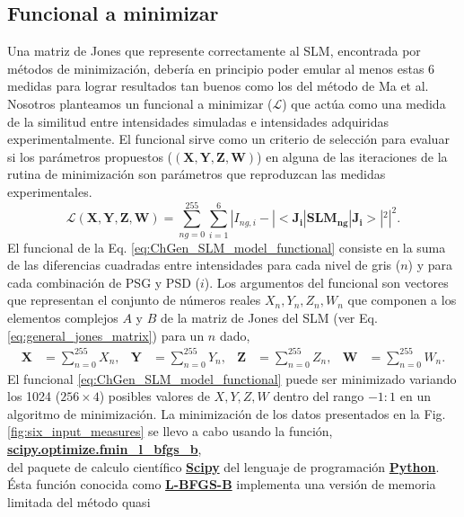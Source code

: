 \subsection{Funcional a minimizar}
Una matriz de Jones que represente correctamente al SLM, encontrada por
métodos de minimización, debería en principio poder
emular al menos estas 6 medidas para lograr resultados tan buenos como
los del método de Ma et al. Nosotros planteamos un funcional a
minimizar ($\mathcal{L}$) que actúa como una medida de la similitud entre 
intensidades simuladas e intensidades adquiridas experimentalmente. El
funcional sirve como un criterio de selección para evaluar si los
parámetros propuestos ($(\mathbf{X,Y,Z,W})$) en alguna de las iteraciones de la rutina de
minimización son parámetros que reproduzcan las medidas
experimentales.  
\begin{equation}
\mathcal{L}(\mathbf{X,Y,Z,W}) = \sum_{ng=0}^{255}\sum_{i=1}^6 | I_{ng,i} -
|<\mathbf{J_{i}}|\mathbf{SLM_{ng}}|\mathbf{J_{i}}>|^2|^2.
\label{eq:ChGen_SLM_model_functional}  
\end{equation}
El funcional de la Eq. \ref{eq:ChGen_SLM_model_functional}  consiste en
la suma de las diferencias cuadradas entre intensidades para cada
nivel de gris ($n$) y para cada combinación de PSG y PSD ($i$). Los
argumentos del funcional son vectores que representan el conjunto de números
reales $X_n, Y_n, Z_n, W_n$ que componen a los elementos complejos $A$ y $B$
de la matriz de Jones del SLM (ver 
Eq. \ref{eq:general_jones_matrix}) para un $n$ dado,
\begin{align*}
\mathbf{X} &= \sum_{n=0}^{255}X_n,&\mathbf{Y} &= \sum_{n=0}^{255}Y_n,&\mathbf{Z} &= \sum_{n=0}^{255}Z_n,&\mathbf{W} &= \sum_{n=0}^{255}W_n.
\end{align*} 
El funcional \ref{eq:ChGen_SLM_model_functional}  puede ser minimizado
variando los 1024 ($256\times 4$) posibles valores 
de $X,Y,Z,W$ dentro del rango $-1:1$ en un algoritmo de
minimización. La minimización de los datos presentados en la
Fig. \ref{fig:six_input_measures} se llevo a cabo usando la función,\\
\hspace*{\fill}
\href{http://goo.gl/tv5Iyz}{\bf{scipy.optimize.fmin\_l\_bfgs\_b}}, \hspace*{\fill}\\ del
 paquete de calculo científico \href{http://goo.gl/fRhz8s}{\textbf{Scipy}} del
 lenguaje de programación \href{https://www.python.org}{\textbf{Python}}. Ésta
 función conocida como \href{http://en.wikipedia.org/wiki/Limited-memory\_BFGS}{\textbf{L-BFGS-B}} implementa una versión de memoria limitada del método quasi
